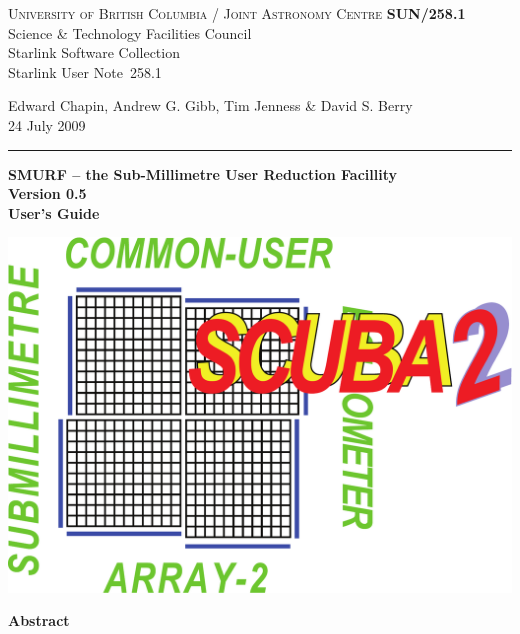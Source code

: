 \documentclass[twoside,11pt]{article}
\newcommand{\stardoccategory}  {Starlink User Note}
\newcommand{\stardocinitials}  {SUN}
\newcommand{\stardocnumber}    {258.1}
\newcommand{\stardocauthors}   {Edward Chapin, Andrew G. Gibb, Tim Jenness \& David S. Berry}
\newcommand{\stardocdate}      {24 July 2009}
\newcommand{\stardoctitle}     {SMURF -- the Sub-Millimetre User Reduction Facillity}
\newcommand{\stardocversion}   {Version 0.5}
\newcommand{\stardocmanual}    {User's Guide}
\newcommand{\stardocname}{\stardocinitials /\stardocnumber}
\newenvironment{latexonly}{}{}
\renewcommand{\_}{\texttt{\symbol{95}}}
\begin{document}
\thispagestyle{empty}

\begin{latexonly}
   \textsc{University of British Columbia} / \textsc{Joint Astronomy Centre} \hfill \textbf{\stardocname}\\
   {\large Science \& Technology Facilities Council}\\
   {\large Starlink Software Collection\\}
   {\large \stardoccategory\ \stardocnumber}
   \begin{flushright}
   \stardocauthors\\
   \stardocdate
   \end{flushright}
   \vspace{-4mm}
   \rule{\textwidth}{0.5mm}
   \vspace{5mm}
   \begin{center}
   {\Huge\textbf{\stardoctitle \\ [2.5ex]}}
   {\LARGE\textbf{\stardocversion \\ [4ex]}}
   {\Huge\textbf{\stardocmanual}}
   \end{center}
   \vspace{5mm}

\begin{center}
\includegraphics[scale=0.3]{sun258_logo}
\end{center}

   \vspace{10mm}
   \begin{center}
      {\Large\textbf{Abstract}}
   \end{center}
\end{latexonly}
\end{document}

